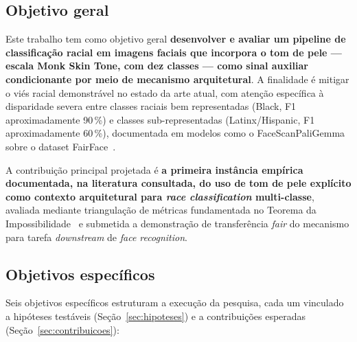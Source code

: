 \subsection{Objetivo geral}
\label{sec:obj_geral}

Este trabalho tem como objetivo geral \textbf{desenvolver e avaliar um pipeline de classificação racial em imagens faciais que incorpora o tom de pele --- escala Monk Skin Tone, com dez classes --- como sinal auxiliar condicionante por meio de mecanismo arquitetural}. A finalidade é mitigar o viés racial demonstrável no estado da arte atual, com atenção específica à disparidade severa entre classes raciais bem representadas (Black, F1 aproximadamente 90\,\%) e classes sub-representadas (Latinx/Hispanic, F1 aproximadamente 60\,\%), documentada em modelos como o FaceScanPaliGemma sobre o dataset FairFace~\cite{aldahoul2024exploring}.

A contribuição principal projetada é \textbf{a primeira instância empírica documentada, na literatura consultada, do uso de tom de pele explícito como contexto arquitetural para \emph{race classification} multi-classe}, avaliada mediante triangulação de métricas fundamentada no Teorema da Impossibilidade~\cite{kleinberg2017inherent} e submetida a demonstração de transferência \emph{fair} do mecanismo para tarefa \emph{downstream} de \emph{face recognition}.

\subsection{Objetivos específicos}
\label{sec:obj_especificos}

Seis objetivos específicos estruturam a execução da pesquisa, cada um vinculado a hipóteses testáveis (Seção~\ref{sec:hipoteses}) e a contribuições esperadas (Seção~\ref{sec:contribuicoes}):

